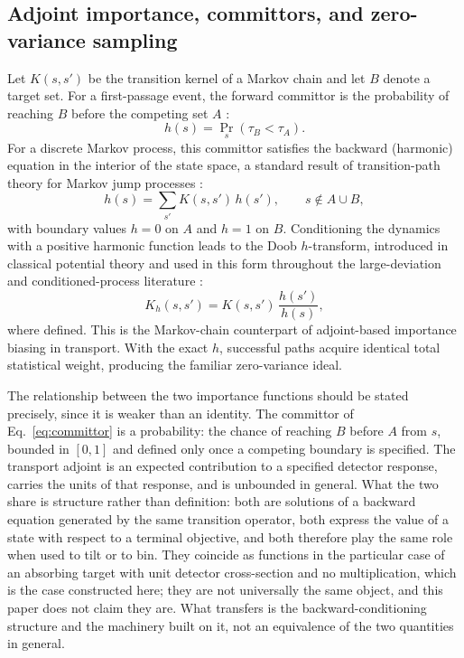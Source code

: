 \documentclass[a4paper,fleqn]{cas-sc}
\begin{document}
\subsection{Adjoint importance, committors, and zero-variance sampling}\label{sec:adjoint}
Let $K(s,s')$ be the transition kernel of a Markov chain and let $B$ denote a target set.
For a first-passage event, the forward committor is the probability of reaching $B$ before
the competing set $A$ \citep{e2006,metzner2009}:
\begin{equation}
h(s)=\Pr_{s}\!\left(\tau_B<\tau_A\right).
\label{eq:committor}
\end{equation}
For a discrete Markov process, this committor satisfies the backward (harmonic) equation in
the interior of the state space, a standard result of transition-path theory for Markov jump
processes \citep{e2006,metzner2009,vandeneijnden2010}:
\begin{equation}
h(s)=\sum_{s'}K(s,s')\,h(s'),\qquad s\notin A\cup B,
\label{eq:harmonic}
\end{equation}
with boundary values $h=0$ on $A$ and $h=1$ on $B$. Conditioning the dynamics with a
positive harmonic function leads to the Doob $h$-transform, introduced in classical potential
theory \citep{doob1984} and used in this form throughout the large-deviation and
conditioned-process literature \citep{touchette2009,chetrite2015}:
\begin{equation}
K_h(s,s')=K(s,s')\,\frac{h(s')}{h(s)},
\label{eq:doob}
\end{equation}
where defined. This is the Markov-chain counterpart of adjoint-based importance biasing in
transport. With the exact $h$, successful paths acquire identical total statistical weight,
producing the familiar zero-variance ideal.

The relationship between the two importance functions should be stated precisely, since it is
weaker than an identity. The committor of Eq.~\eqref{eq:committor} is a probability: the chance
of reaching $B$ before $A$ from $s$, bounded in $[0,1]$ and defined only once a competing
boundary is specified. The transport adjoint is an expected contribution to a specified
detector response, carries the units of that response, and is unbounded in general. What the
two share is structure rather than definition: both are solutions of a backward equation
generated by the same transition operator, both express the value of a state with respect to a
terminal objective, and both therefore play the same role when used to tilt or to bin. They
coincide as functions in the particular case of an absorbing target with unit detector
cross-section and no multiplication, which is the case constructed here; they are not
universally the same object, and this paper does not claim they are. What transfers is the
backward-conditioning structure and the machinery built on it, not an equivalence of the two
quantities in general.
\end{document}

